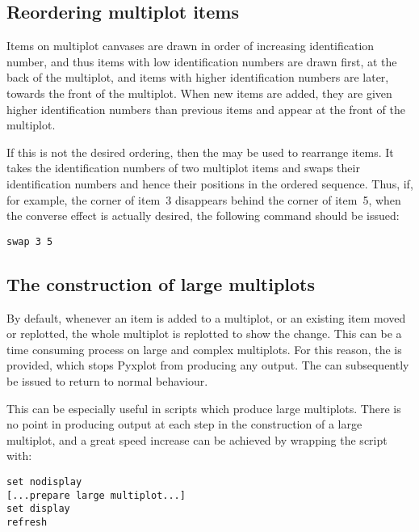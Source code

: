 \subsection{Reordering multiplot items}

Items on multiplot canvases are drawn in order of increasing identification
number, and thus items with low identification numbers are drawn first, at the
back of the multiplot, and items with higher identification numbers are later,
towards the front of the multiplot. When new items are added, they are given
higher identification numbers than previous items and appear at the front of
the multiplot.

If this is not the desired ordering, then the  may be used to
rearrange items. It takes the identification numbers of two multiplot items and
swaps their identification numbers and hence their positions in the ordered
sequence.  Thus, if, for example, the corner of item~3 disappears behind the
corner of item~5, when the converse effect is actually desired, the following
command should be issued:
\begin{verbatim}
swap 3 5
\end{verbatim}

\subsection{The construction of large multiplots}
\label{sec:set_display}

By default, whenever an item is added to a multiplot, or an existing item moved
or replotted, the whole multiplot is replotted to show the change. This can be
a time consuming process on large and complex multiplots. For this reason, the
 is provided, which stops Pyxplot from producing any
output. The  can subsequently be issued to return to
normal behaviour.

This can be especially useful in scripts which produce large multiplots. There
is no point in producing output at each step in the construction of a large
multiplot, and a great speed increase can be achieved by wrapping the script
with:

\begin{verbatim}
set nodisplay
[...prepare large multiplot...]
set display
refresh
\end{verbatim}


